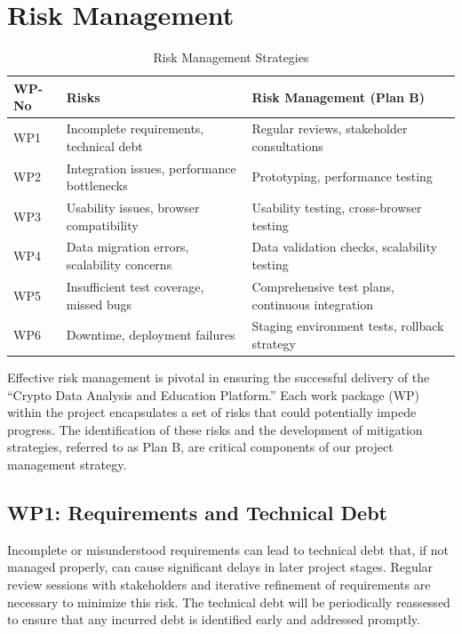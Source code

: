\documentclass[12pt]{report}
\begin{document}
\section{Risk Management}
\begin{table}[h]
\centering
\begin{tabular}{|l|p{6cm}|p{7cm}|}
\hline
\textbf{WP-No} & \textbf{Risks}                                 & \textbf{Risk Management (Plan B)}          \\ \hline
WP1            & Incomplete requirements, technical debt         & Regular reviews, stakeholder consultations \\ \hline
WP2            & Integration issues, performance bottlenecks     & Prototyping, performance testing           \\ \hline
WP3            & Usability issues, browser compatibility         & Usability testing, cross-browser testing   \\ \hline
WP4            & Data migration errors, scalability concerns     & Data validation checks, scalability testing\\ \hline
WP5            & Insufficient test coverage, missed bugs         & Comprehensive test plans, continuous integration \\ \hline
WP6            & Downtime, deployment failures                  & Staging environment tests, rollback strategy \\ \hline
\end{tabular}
\caption{Risk Management Strategies}
\label{table:risk_managementand}
\end{table}

Effective risk management is pivotal in ensuring the successful delivery of the ``Crypto Data Analysis and Education Platform.'' Each work package (WP) within the project encapsulates a set of risks that could potentially impede progress. The identification of these risks and the development of mitigation strategies, referred to as Plan B, are critical components of our project management strategy.

\subsection{WP1: Requirements and Technical Debt}
Incomplete or misunderstood requirements can lead to technical debt that, if not managed properly, can cause significant delays in later project stages. Regular review sessions with stakeholders and iterative refinement of requirements are necessary to minimize this risk. The technical debt will be periodically reassessed to ensure that any incurred debt is identified early and addressed promptly.
\end{document}

